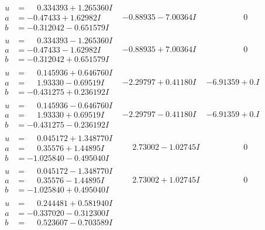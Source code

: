 \documentclass[1p]{elsarticle_modified}
\theoremstyle{definition}
\begin{document}
$$\begin{array}{c|c|c}
\begin{aligned}
u &= \phantom{-}0.334393 + 1.265360 I \\
a &= -0.47433 + 1.62982 I \\
b &= -0.312042 - 0.651579 I\end{aligned}
 & -0.88935 - 7.00364 I & \phantom{-0.000000 } 0 \\ \hline\begin{aligned}
u &= \phantom{-}0.334393 - 1.265360 I \\
a &= -0.47433 - 1.62982 I \\
b &= -0.312042 + 0.651579 I\end{aligned}
 & -0.88935 + 7.00364 I & \phantom{-0.000000 } 0 \\ \hline\begin{aligned}
u &= \phantom{-}0.145936 + 0.646760 I \\
a &= \phantom{-}1.93330 - 0.69519 I \\
b &= -0.431275 + 0.236192 I\end{aligned}
 & -2.29797 + 0.41180 I & -6.91359 + 0. I\phantom{ +0.000000I} \\ \hline\begin{aligned}
u &= \phantom{-}0.145936 - 0.646760 I \\
a &= \phantom{-}1.93330 + 0.69519 I \\
b &= -0.431275 - 0.236192 I\end{aligned}
 & -2.29797 - 0.41180 I & -6.91359 + 0. I\phantom{ +0.000000I} \\ \hline\begin{aligned}
u &= \phantom{-}0.045172 + 1.348770 I \\
a &= \phantom{-}0.35576 + 1.44895 I \\
b &= -1.025840 - 0.495040 I\end{aligned}
 & \phantom{-}2.73002 - 1.02745 I & \phantom{-0.000000 } 0 \\ \hline\begin{aligned}
u &= \phantom{-}0.045172 - 1.348770 I \\
a &= \phantom{-}0.35576 - 1.44895 I \\
b &= -1.025840 + 0.495040 I\end{aligned}
 & \phantom{-}2.73002 + 1.02745 I & \phantom{-0.000000 } 0 \\ \hline\begin{aligned}
u &= \phantom{-}0.244481 + 0.581940 I \\
a &= -0.337020 - 0.312300 I \\
b &= \phantom{-}0.523607 - 0.703589 I\end{aligned}

\end{array}$$
\end{document}
